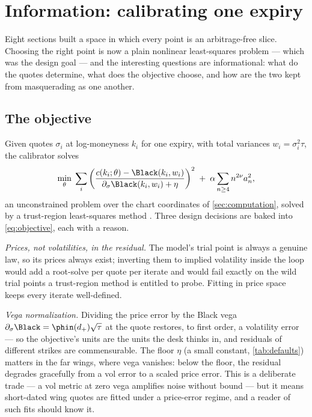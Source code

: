 \section{Information: calibrating one expiry}
\label{sec:calibration}

Eight sections built a space in which every point is an arbitrage-free
slice.  Choosing the right point is now a plain nonlinear least-squares
problem --- which was the design goal --- and the interesting questions
are informational: what do the quotes determine, what does the objective
choose, and how are the two kept from masquerading as one another.

\subsection{The objective}

Given quotes $\sigma_i$ at log-moneyness $k_i$ for one expiry, with total
variances $w_i=\sigma_i^{2}\tau$, the calibrator solves
\begin{equation}
\min_{\theta}\;
\sum_i \left(
\frac{c(k_i;\theta)-\Black(k_i,w_i)}
     {\partial_\sigma\Black(k_i,w_i)+\eta}
\right)^{2}
\;+\;\alpha\sum_{n\ge4}n^{2\nu}a_n^{2},
\label{eq:objective}
\end{equation}
an unconstrained problem over the chart coordinates of
\cref{sec:computation}, solved by a trust-region least-squares method
\citep{BranchColemanLi1999,SciPy2020}.  Three design decisions are baked
into \eqref{eq:objective}, each with a reason.

\emph{Prices, not volatilities, in the residual.}  The model's trial
point is always a genuine law, so its prices always exist; inverting
them to implied volatility inside the loop would add a root-solve per
quote per iterate and would fail exactly on the wild trial points a
trust-region method is entitled to probe.  Fitting in price space keeps
every iterate well-defined.

\emph{Vega normalization.}  Dividing the price error by the Black vega
$\partial_\sigma\Black=\phin(d_+)\sqrt{\tau}$ at the quote restores, to
first order, a volatility error --- so the objective's units are the units
the desk thinks in, and residuals of different strikes are commensurable.
The floor $\eta$ (a small constant, \cref{tab:defaults}) matters in the
far wings, where vega vanishes: below the floor, the residual degrades
gracefully from a vol error to a scaled price error.  This is a deliberate
trade --- a vol metric at zero vega amplifies noise without bound --- but
it means short-dated wing quotes are fitted under a price-error regime,
and a reader of such fits should know it.

